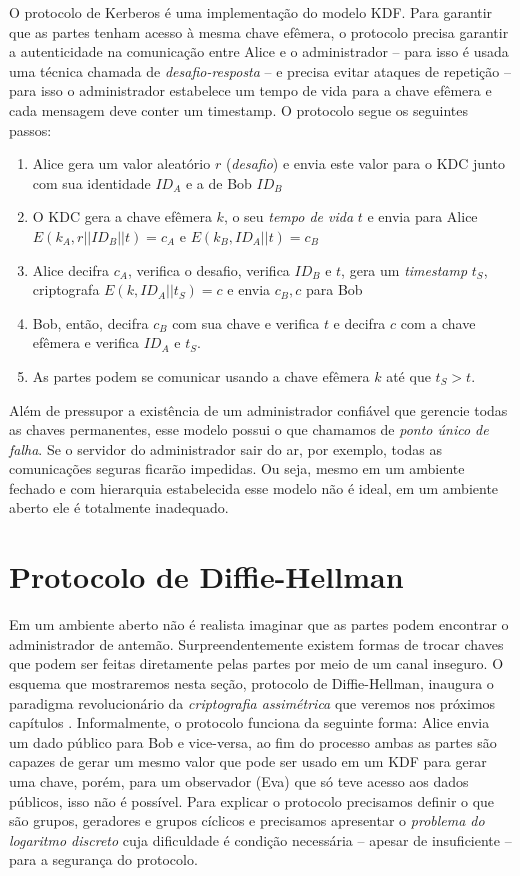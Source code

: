 O protocolo de Kerberos é uma implementação do modelo KDF.
Para garantir que as partes tenham acesso à mesma chave efêmera, o protocolo precisa garantir a autenticidade na comunicação entre Alice e o administrador -- para isso é usada uma técnica chamada de {\em desafio-resposta} -- e precisa evitar ataques de repetição -- para isso o administrador estabelece um tempo de vida para a chave efêmera e cada mensagem deve conter um timestamp.
O protocolo segue os seguintes passos:
\begin{enumerate}
\item Alice gera um valor aleatório $r$ ({\em desafio}) e envia este valor para o KDC junto com sua identidade $ID_A$ e a de Bob $ID_B$
\item O KDC gera a chave efêmera $k$, o seu {\em tempo de vida} $t$ e envia para  Alice $E(k_A, r||ID_B||t) = c_A$ e $E(k_B, ID_A||t) = c_B$
\item Alice decifra $c_A$, verifica o desafio, verifica $ID_B$ e $t$, gera um {\em timestamp} $t_S$, criptografa $E(k, ID_A||t_S) = c$ e envia $c_B, c$ para Bob
\item Bob, então, decifra $c_B$ com sua chave e verifica $t$ e decifra $c$ com a chave efêmera e verifica $ID_A$ e $t_S$.
\item As partes podem se comunicar usando a chave efêmera $k$ até que $t_S > t$.
\end{enumerate}

Além de pressupor a existência de um administrador confiável que gerencie todas as chaves permanentes, esse modelo possui o que chamamos de {\em ponto único de falha}.
Se o servidor do administrador sair do ar, por exemplo, todas as comunicações seguras ficarão impedidas.
Ou seja, mesmo em um ambiente fechado e com hierarquia estabelecida esse modelo não é ideal, em um ambiente aberto ele é totalmente inadequado.

\section{Protocolo de Diffie-Hellman}
\label{sec:diffie-hellman}

Em um ambiente aberto não é realista imaginar que as partes podem encontrar o administrador de antemão.
Surpreendentemente existem formas de trocar chaves que podem ser feitas diretamente pelas partes por meio de um canal inseguro.
O esquema que mostraremos nesta seção, protocolo de Diffie-Hellman, inaugura o paradigma revolucionário da {\em criptografia assimétrica} que veremos nos próximos capítulos \cite{}.
Informalmente, o protocolo funciona da seguinte forma: Alice envia um dado público para Bob e vice-versa, ao fim do processo ambas as partes são capazes de gerar um mesmo valor que pode ser usado em um KDF para gerar uma chave, porém, para um observador (Eva) que só teve acesso aos dados públicos, isso não é possível.
Para explicar o protocolo precisamos definir o que são grupos, geradores e grupos cíclicos e precisamos apresentar o {\em problema do logaritmo discreto} cuja dificuldade é condição necessária -- apesar de insuficiente -- para a segurança do protocolo.

